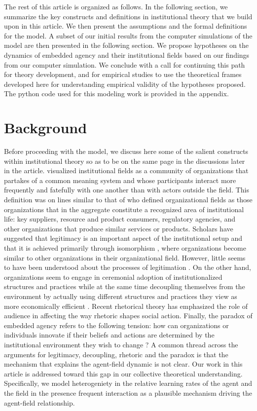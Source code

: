 \documentclass[12pt,letterpaper]{article}
\begin{document}
The rest of this article is organized as follows. In the following section, we summarize the key constructs and definitions in institutional theory that we build upon in this article. We then present the assumptions and the formal definitions for the model. A subset of our initial results from the computer simulations of the model are then presented in the following section. We propose hypotheses on the dynamics of embedded agency and their institutional fields based on our findings from our computer simulation. We conclude with a call for continuing this path for theory development, and for empirical studies to use the theoretical frames developed here for understanding empirical validity of the hypotheses proposed. The python code used for this modeling work is provided in the appendix.

\section{Background}
Before proceeding with the model, we discuss here some of the salient constructs within institutional theory so as to be on the same page in the discussions later in the article. \cite{Scott1995} visualized institutional fields as a community of organizations that partakes of a common meaning system and whose participants interact more frequently and fatefully with one another than with actors outside the field. This definition was on lines similar to that of \cite{Dimaggio1983} who defined organizational fields as those organizations that in the aggregate constitute a recognized area of institutional life: key suppliers, resource and product consumers, regulatory agencies, and other organizations that produce similar services or products. 
Scholars have suggested that legitimacy is an important aspect of the institutional setup and that it  is achieved primarily through isomorphism \citep{Kostova2008}, where organizations become similar to other organizations in their organizational field. However, little seems to have been understood about the processes of legitimation \citep{Harmon2015}. 
On the other hand, organizations seem to engage in ceremonial adoption of institutionalized structures and practices while at the same time decoupling themselves from the environment by actually using different structures and practices they view as more economically efficient \citep{Kostova2008}. Recent rhetorical theory has emphasized the role of audience in affecting the way rhetoric shapes social action. Finally, the paradox of embedded agency refers  to the following tension: how can organizations or individuals innovate if their beliefs and actions are determined by the institutional environment they wish to change \citep{Scott1987}? 
A common thread across the arguments for legitimacy, decoupling, rhetoric and the paradox is that the mechanism that explains the agent-field dynamic is not clear. Our work in this article is addressed toward this gap in our collective theoretical understanding. Specifically, we model heterogeniety in the relative learning rates of the agent and the field in the presence frequent interaction as a plausible mechanism driving the agent-field relationship.
\end{document}
